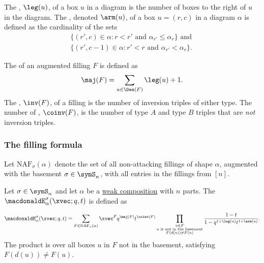The \label{macdonaldFillingLeg}, $\leg(u)$, of a box $u$ in a
diagram is the number of boxes to the right of $u$ in the diagram.
The \label{macdonaldFillingArm}, denoted $\arm(u)$, of a box
$u = (r,c)$ in a diagram $\alpha$ is defined as the cardinality of the sets
\begin{align*}
\{ (r', c) \in \alpha : r < r' \text{ and } \alpha_{r'} \leq \alpha_r \} \text{ and } \\
\{ (r', c-1) \in \alpha : r' < r \text{ and } \alpha_{r'} < \alpha_r \}.
\end{align*}

The \label{macdonaldFillingMajorIndex} of an augmented
filling $F$ is defined as
\begin{align*}
\maj(F) = \sum_{ u \in \Des(F) } \leg(u)+1.
\end{align*}
The \label{macdonaldFillingInversionNumber},
$\inv(F)$, of a filling is the number of inversion triples of either type.
The number of \label{coinversion}, $\coinv(F)$, is the
number of type $A$ and type $B$ triples that are \emph{not}
inversion triples.


\subsubsection[permutedBasementMacdonaldFormula]{The filling formula}

Let $\mathrm{NAF}_\sigma(\alpha)$ denote the set of all non-attacking fillings
of shape $\alpha$, augmented with the basement $\sigma \in \symS_n$, with all
entries in the fillings from $[n]$.


\begin{definition}
Let $\sigma \in \symS_n$ and let $\alpha$ be a
\hyperref[weakCompositionDefinition]{weak composition} with $n$ parts.
The 
\label{nonSymmetricPermutedBasementMacdonaldPolynomial}
$\macdonaldE^\sigma_\alpha(\xvec;q,t)$ is defined as

\begin{equation}
\macdonaldE^\sigma_\alpha(\xvec; q,t) = \sum_{ F \in \mathrm{NAF}_\sigma(\alpha)}
\xvec^F q^{\maj(F)} t^{\coinv(F)}
\prod_{ \substack{ u \in F \\ u \text{ is not in the basement} \\ F(d(u))\neq F(u) }}
  \frac{1-t}{1-q^{1+\leg(u)} t^{1+\arm(u)}}.
\end{equation}
The product is over all boxes $u$ in $F$ not in the basement,
satisfying $F(d(u))\neq F(u)$.
\end{definition}

